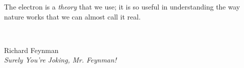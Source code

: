 %


\begin{alwayssingle}
    \thispagestyle{empty}
    \begin{center}
        \vspace*{1.5cm}
        {\LARGE }
    \end{center}
    \vspace{0.5cm}
        \begin{center}
            \parbox{0.65\textwidth}{
                \raggedright   
                
                The electron is a \textit{theory} that we use; it is so useful in understanding the way nature works that we can almost call it real. \\
            }\\
        \end{center}
        \vspace{0.2cm}
        \raggedleft
        Richard Feynman\\
        \textit{Surely You're Joking, Mr. Feynman!} \\
            
       
\end{alwayssingle}